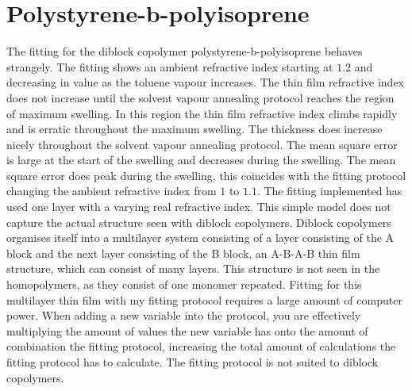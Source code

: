 \documentclass[MasterThesisMain.tex]{subfiles}
\begin{document}
\section{Polystyrene-b-polyisoprene}
The fitting for the diblock copolymer polystyrene-b-polyisoprene behaves strangely. The fitting shows an ambient refractive index starting at $1.2$ and decreasing in value as the toluene vapour increases. The thin film refractive index does not increase until the solvent vapour annealing protocol reaches the region of maximum swelling. In this region the thin film refractive index climbs rapidly and is erratic throughout the maximum swelling. The thickness does increase nicely throughout the solvent vapour annealing protocol. The mean square error is large at the start of the swelling and decreases during the swelling. The mean square error does peak during the swelling, this coincides with the fitting protocol changing the ambient refractive index from $1$ to $1.1$. The fitting implemented has used one layer with a varying real refractive index. This simple model does not capture the actual structure seen with diblock copolymers. Diblock copolymers organises itself into a multilayer system consisting of a layer consisting of the A block and the next layer consisting of the B block, an A-B-A-B thin film structure, which can consist of many layers. This structure is not seen in the homopolymers, as they consist of one monomer repeated. Fitting for this multilayer thin film with my fitting protocol requires a large amount of computer power. When adding a new variable into the protocol, you are effectively multiplying the amount of values the new variable has onto the amount of combination the fitting protocol, increasing the total amount of calculations the fitting protocol has to calculate. The fitting protocol is not suited to diblock copolymers.     
\end{document}
